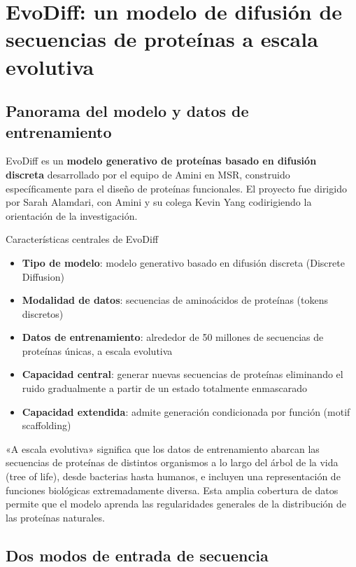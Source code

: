 \section{EvoDiff: un modelo de difusión de secuencias de proteínas a escala evolutiva}

\subsection{Panorama del modelo y datos de entrenamiento}

EvoDiff es un \textbf{modelo generativo de proteínas basado en difusión discreta} desarrollado por el equipo de Amini en MSR, construido específicamente para el diseño de proteínas funcionales. El proyecto fue dirigido por Sarah Alamdari, con Amini y su colega Kevin Yang codirigiendo la orientación de la investigación.

\begin{importantbox}{Características centrales de EvoDiff}
\begin{itemize}
    \item \textbf{Tipo de modelo}: modelo generativo basado en difusión discreta (Discrete Diffusion)
    \item \textbf{Modalidad de datos}: secuencias de aminoácidos de proteínas (tokens discretos)
    \item \textbf{Datos de entrenamiento}: alrededor de 50 millones de secuencias de proteínas únicas, a escala evolutiva
    \item \textbf{Capacidad central}: generar nuevas secuencias de proteínas eliminando el ruido gradualmente a partir de un estado totalmente enmascarado
    \item \textbf{Capacidad extendida}: admite generación condicionada por función (motif scaffolding)
\end{itemize}
\end{importantbox}

«A escala evolutiva» significa que los datos de entrenamiento abarcan las secuencias de proteínas de distintos organismos a lo largo del árbol de la vida (tree of life), desde bacterias hasta humanos, e incluyen una representación de funciones biológicas extremadamente diversa. Esta amplia cobertura de datos permite que el modelo aprenda las regularidades generales de la distribución de las proteínas naturales.

\subsection{Dos modos de entrada de secuencia}

